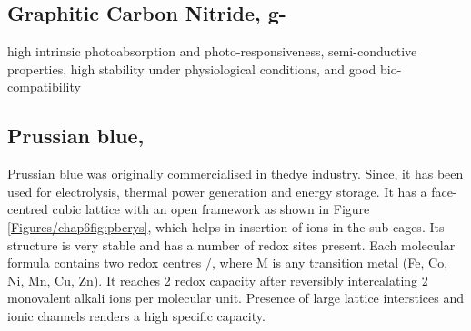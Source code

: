 \subsection*{Graphitic Carbon Nitride, g-}
high intrinsic photoabsorption and photo-responsiveness, semi-conductive properties, high stability under physiological conditions, and good bio-compatibility
\subsection*{Prussian blue, }
Prussian blue was originally commercialised in thedye industry. Since, it has been used for electrolysis, thermal power generation and energy storage. It has a face-centred cubic lattice with an open framework as shown in Figure \ref{Figures/chap6fig:pbcrys}, which helps in insertion of ions in the sub-cages. Its structure is very stable and has a number of redox sites present. Each molecular formula contains two redox centres /, where M is any transition metal (Fe, Co, Ni, Mn, Cu, Zn). It reaches 2 redox capacity after reversibly intercalating 2 monovalent alkali ions per molecular unit. Presence of large lattice interstices and ionic channels renders a high specific capacity. 

